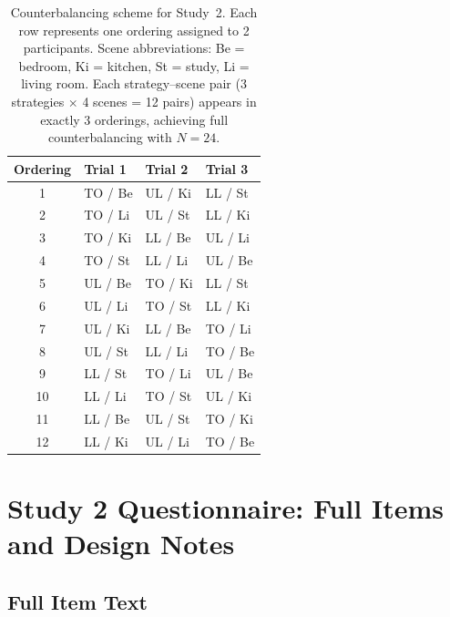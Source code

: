 \documentclass[manuscript,review,anonymous]{acmart}
\begin{document}
\begin{table}[h]
\centering
\caption{Counterbalancing scheme for Study~2. Each row represents one ordering assigned to 2 participants. Scene abbreviations: Be = bedroom, Ki = kitchen, St = study, Li = living room. Each strategy--scene pair (3 strategies $\times$ 4 scenes = 12 pairs) appears in exactly 3 orderings, achieving full counterbalancing with $N = 24$.}
\label{tab:latin-square}
\begin{tabularx}{\linewidth}{@{} c >{\centering\arraybackslash}X >{\centering\arraybackslash}X >{\centering\arraybackslash}X @{}}
\toprule
\textbf{Ordering} & \textbf{Trial 1} & \textbf{Trial 2} & \textbf{Trial 3} \\
\midrule
1  & TO / Be  & UL / Ki & LL / St \\
2  & TO / Li  & UL / St & LL / Ki \\
3  & TO / Ki  & LL / Be & UL / Li \\
4  & TO / St  & LL / Li & UL / Be \\
5  & UL / Be & TO / Ki  & LL / St \\
6  & UL / Li & TO / St  & LL / Ki \\
7  & UL / Ki & LL / Be & TO / Li  \\
8  & UL / St & LL / Li & TO / Be  \\
9  & LL / St & TO / Li  & UL / Be \\
10 & LL / Li & TO / St  & UL / Ki \\
11 & LL / Be & UL / St & TO / Ki  \\
12 & LL / Ki & UL / Li & TO / Be  \\
\bottomrule
\end{tabularx}
\end{table}


\section{Study 2 Questionnaire: Full Items and Design Notes}
\label{app:study2-questionnaire}

\subsection*{Full Item Text}
\end{document}
